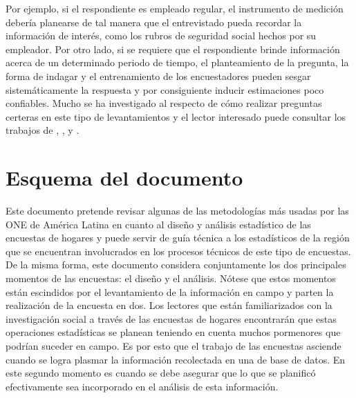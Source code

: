 \documentclass[
  12pt,
  spanish,
]{book}
\begin{document}
Por ejemplo, si el respondiente es empleado regular, el instrumento de medición debería planearse de tal manera que el entrevistado pueda recordar la información de interés, como los rubros de seguridad social hechos por su empleador. Por otro lado, si se requiere que el respondiente brinde información acerca de un determinado periodo de tiempo, el planteamiento de la pregunta, la forma de indagar y el entrenamiento de los encuestadores pueden sesgar sistemáticamente la respuesta y por consiguiente inducir estimaciones poco confiables. Mucho se ha investigado al respecto de cómo realizar preguntas certeras en este tipo de levantamientos y el lector interesado puede consultar los trabajos de \citet{Biemer_Lyberg_2003}, \citet{Presser_Rothgeb_Couper_Lessler_Martin_Martin_Singer_2004}, y \citet{Groves_Fowler_Couper_Lepkowski_Singer_Tourangeau_2009}.

\hypertarget{esquema-del-documento}{%
\section{Esquema del documento}\label{esquema-del-documento}}

Este documento pretende revisar algunas de las metodologías más usadas por las ONE de América Latina en cuanto al diseño y análisis estadístico de las encuestas de hogares y puede servir de guía técnica a los estadísticos de la región que se encuentran involucrados en los procesos técnicos de este tipo de encuestas. De la misma forma, este documento considera conjuntamente los dos principales momentos de las encuestas: el diseño y el análisis. Nótese que estos momentos están escindidos por el levantamiento de la información en campo y parten la realización de la encuesta en dos. Los lectores que están familiarizados con la investigación social a través de las encuestas de hogares encontrarán que estas operaciones estadísticas se planean teniendo en cuenta muchos pormenores que podrían suceder en campo. Es por esto que el trabajo de las encuestas asciende cuando se logra plasmar la información recolectada en una de base de datos. En este segundo momento es cuando se debe asegurar que lo que se planificó efectivamente sea incorporado en el análisis de esta información.
\end{document}
